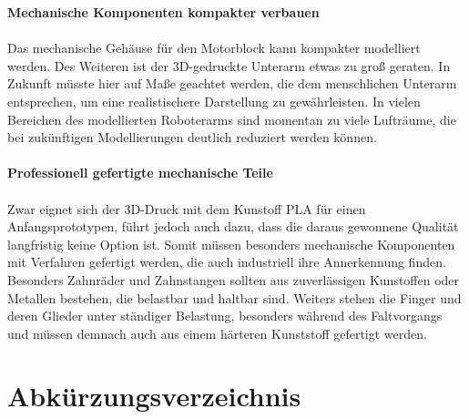 \documentclass[titlepage,12pt,twoside]{article}
\begin{document}
\textbf{Mechanische Komponenten kompakter verbauen} \\
\\
Das mechanische Gehäuse für den Motorblock kann kompakter modelliert werden. Des Weiteren ist der 
3D-gedruckte Unterarm etwas zu groß geraten. In Zukunft müsste hier auf Maße geachtet werden, die 
dem menschlichen Unterarm entsprechen, um eine realistischere Darstellung zu gewährleisten. 
In vielen Bereichen des modellierten Roboterarms sind momentan zu viele Lufträume, die bei 
zukünftigen Modellierungen deutlich reduziert werden können. \\
\\
\textbf{Professionell gefertigte mechanische Teile} \\
\\
Zwar eignet sich der 3D-Druck mit dem Kunstoff PLA für einen Anfangsprototypen, führt jedoch auch dazu, dass die daraus gewonnene Qualität langfristig keine Option ist.
Somit müssen besonders mechanische Komponenten mit Verfahren gefertigt werden, die auch industriell ihre Annerkennung finden. Besonders Zahnräder und Zahnstangen
sollten aus zuverlässigen Kunstoffen oder Metallen bestehen, die belastbar und haltbar sind. Weiters stehen die Finger und deren Glieder unter ständiger Belastung, 
besonders während des Faltvorgangs und müssen demnach auch aus einem härteren Kunststoff gefertigt werden.
\\

\newpage
\section{Abkürzungsverzeichnis}
\end{document}
